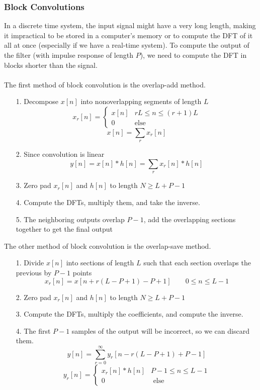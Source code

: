 \documentclass{article}
\begin{document}
\subsubsection{Block Convolutions}
In a discrete time system, the input signal might have a very long length, making it impractical to be stored in a computer's memory
or to compute the DFT of it all at once (especially if we have a real-time system). To compute the output of the filter (with impulse response of length $P$), we need to compute
the DFT in blocks shorter than the signal. \\\\The first method of block convolution is the overlap-add method.
\begin{itemize}
  \item[1.] Decompose $x[n]$ into nonoverlapping segments of length $L$
  \[ x_r[n] =
    \begin{cases}
      x[n] & rL \le n \le (r+1)L\\
      0 & \text{else}
    \end{cases}
  \]
  $$x[n] = \sum_{r}x_r[n]$$
  \item[2.] Since convolution is linear
  $$y[n] = x[n]*h[n]=\sum_r{x_r[n]*h[n]}$$
  \item[3.] Zero pad $x_r[n]$ and $h[n]$ to length $N\ge L+P-1$
  \item[4.] Compute the DFTs, multiply them, and take the inverse.
  \item[5.] The neighboring outputs overlap $P-1$, add the overlapping sections together to get the final output  
\end{itemize}
The other method of block convolution is the overlap-save method.
\begin{itemize}
  \item[1.] Divide $x[n]$ into sections of length $L$ such that each section overlaps the previous by $P-1$ points
  $$x_r[n]=x[n+r(L-P+1)-P+1] \qquad 0 \le n \le L-1$$
  \item[2.] Zero pad $x_r[n]$ and $h[n]$ to length $N\ge L+P-1$
  \item[3.] Compute the DFTs, multiply the coefficients, and compute the inverse.
  \item[4.] The first $P-1$ samples of the output will be incorrect, so we can discard them.
  $$y[n]=\sum_{r=0}^{\infty}y_r[n-r(L-P+1)+P-1]$$
  \[
    y_r[n]=
    \begin{cases}
      x_r[n]*h[n] & P-1\le n \le L-1\\
      0 & \text{ else}
    \end{cases}
  \]
\end{itemize}
\end{document}
